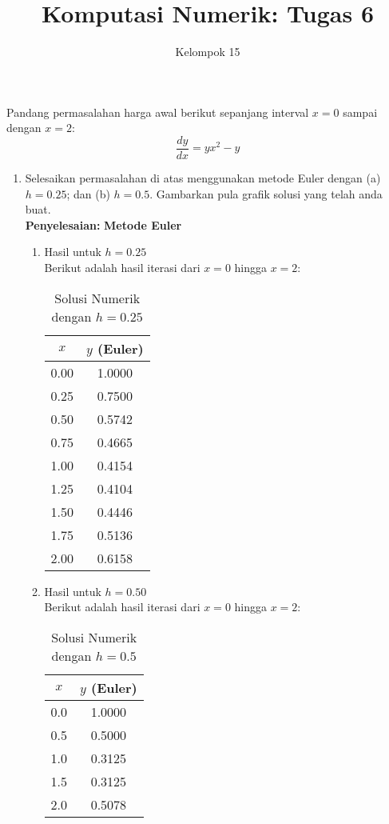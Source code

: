 \documentclass{article}
\title{\textbf{Komputasi Numerik: Tugas 6}}
\author{Kelompok 15}
\date{}
\newcommand{\penyelesaian}{\textbf{Penyelesaian: }}
\begin{document}
\maketitle

Pandang permasalahan harga awal berikut sepanjang interval $x = 0$ sampai dengan $x = 2$:
\begin{equation*}
    \frac{dy}{dx} = yx^2 - y
\end{equation*}
\begin{enumerate}
    \item Selesaikan permasalahan di atas menggunakan metode Euler dengan (a) $h = \num{0,25}$; dan (b) $h = \num{0,5}$. Gambarkan pula grafik solusi yang telah anda buat. \\
    \penyelesaian \textbf{Metode Euler}
    \begin{enumerate}
        \item Hasil untuk \( h = 0.25 \) \\
        Berikut adalah hasil iterasi dari \( x = 0 \) hingga \( x = 2 \):
        \begin{table}[h]
        \centering
        \caption{Solusi Numerik dengan \( h = 0.25 \)}
        \begin{tabular}{cc}
        \toprule
        \( x \) & \( y \) (Euler) \\
        \midrule
        0.00 & 1.0000 \\
        0.25 & 0.7500 \\
        0.50 & 0.5742 \\
        0.75 & 0.4665 \\
        1.00 & 0.4154 \\
        1.25 & 0.4104 \\
        1.50 & 0.4446 \\
        1.75 & 0.5136 \\
        2.00 & 0.6158 \\
        \bottomrule
        \end{tabular}
        \end{table}

        \item Hasil untuk $h = \num{0,50}$ \\
        Berikut adalah hasil iterasi dari \( x = 0 \) hingga \( x = 2 \):

        \begin{table}[h]
        \centering
        \caption{Solusi Numerik dengan \( h = 0.5 \)}
        \begin{tabular}{cc}
        \toprule
        \( x \) & \( y \) (Euler) \\
        \midrule
        0.0 & 1.0000 \\
        0.5 & 0.5000 \\
        1.0 & 0.3125 \\
        1.5 & 0.3125 \\
        2.0 & 0.5078 \\
        \bottomrule
        \end{tabular}
        \end{table}
    \end{enumerate}


\end{enumerate}
\end{document}
